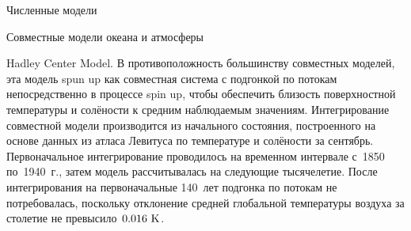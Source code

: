 \begin{chapter}{Численные модели}
\begin{section}{Совместные модели океана и атмосферы}
\begin{paragraph}{Hadley Center Model.}
В противоположность большинству совместных моделей, эта модель
spun up как совместная система с подгонкой по потокам%
 непосредственно
в процессе spin up, чтобы обеспечить близость поверхностной температуры и
солёности к средним наблюдаемым значениям. Интегрирование совместной модели
производится из начального состояния, построенного на основе данных из
атласа Левитуса по температуре и солёности за сентябрь. Первоначальное
интегрирование проводилось на временном интервале с~1850 по~1940~г., 
затем модель рассчитывалась на следующие тысячелетие. После интегрирования
на первоначальные 140~лет подгонка по потокам%
 не потребовалась,
поскольку отклонение средней глобальной температуры воздуха 
за столетие не превысило~$0.016\mbox{~K}$.
%
\end{paragraph}


\end{section}
\end{chapter}
